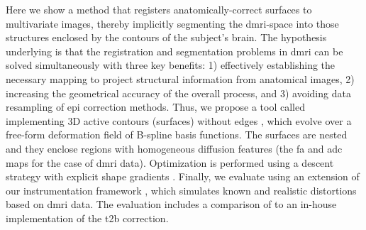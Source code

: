 Here we show a method that registers anatomically-correct surfaces to multivariate images,
  thereby implicitly segmenting the \gls*{dmri}-space into those structures enclosed by the contours
  of the subject's brain.
The hypothesis underlying is that the registration and segmentation problems in \gls*{dmri}
  can be solved simultaneously with three key benefits:
  1) effectively establishing the necessary mapping to project structural information from anatomical images,
  2) increasing the geometrical accuracy of the overall process,
  and 3) avoiding data resampling of \gls*{epi} correction methods.
Thus, we propose a tool called \regseg{} implementing 3D active contours (surfaces) without edges
  \citep{chan_active_2001}, which evolve over a free-form deformation field of B-spline
  basis functions.
The surfaces are nested and they enclose regions with homogeneous diffusion features
  (the \gls*{fa} and \gls*{adc} maps for the case of \gls*{dmri} data).
Optimization is performed using a descent strategy with explicit shape gradients
  \citep{besson_dream2s_2003,herbulot_segmentation_2006}.
Finally, we evaluate \regseg{} using an extension of our instrumentation framework
  \citep{esteban_simulationbased_2014}, which simulates known and realistic distortions
  based on \gls*{dmri} data.
The evaluation includes a comparison of \regseg{} to an in-house implementation of
  the \gls*{t2b} correction.
